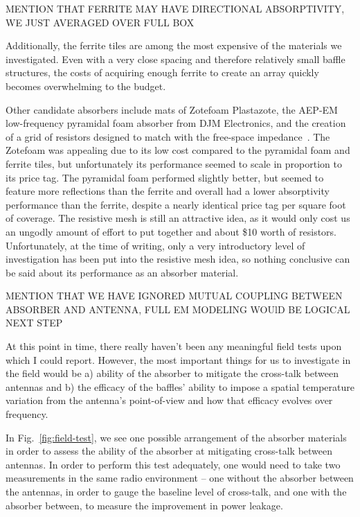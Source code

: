 MENTION THAT FERRITE MAY HAVE DIRECTIONAL ABSORPTIVITY, WE JUST AVERAGED OVER 
FULL BOX

Additionally, the ferrite tiles are among the most expensive of the materials 
we investigated. Even with a very close spacing and therefore relatively small 
baffle structures, the costs of acquiring enough ferrite to create an array 
quickly becomes overwhelming to the budget.

Other candidate absorbers include mats of Zotefoam Plastazote\textregistered, 
the AEP-EM low-frequency pyramidal foam absorber from DJM Electronics, and the 
creation of a grid of resistors designed to match with the free-space 
impedance~\citep{mahesh2015}. The Zotefoam was appealing due to its low cost 
compared to the pyramidal foam and ferrite tiles, but unfortunately its 
performance seemed to scale in proportion to its price tag.  The pyramidal foam 
performed slightly better, but seemed to feature more reflections than the 
ferrite and overall had a lower absorptivity performance than the ferrite, 
despite a nearly identical price tag per square foot of coverage. The resistive 
mesh is still an attractive idea, as it would only cost us an ungodly amount of 
effort to put together and about \$10 worth of resistors. Unfortunately, at the 
time of writing, only a very introductory level of investigation has been put 
into the resistive mesh idea, so nothing conclusive can be said about its 
performance as an absorber material.

MENTION THAT WE HAVE IGNORED MUTUAL COUPLING BETWEEN ABSORBER AND ANTENNA, FULL 
EM MODELING WOUlD BE LOGICAL NEXT STEP

At this point in time, there really haven't been any meaningful field tests 
upon which I could report. However, the most important things for us to 
investigate in the field would be a) ability of the absorber to mitigate the 
cross-talk between antennas and b) the efficacy of the baffles' ability to 
impose a spatial temperature variation from the antenna's point-of-view and how 
that efficacy evolves over frequency.

In Fig.~\ref{fig:field-test}, we see one possible arrangement of the absorber 
materials in order to assess the ability of the absorber at mitigating 
cross-talk between antennas. In order to perform this test adequately, one 
would need to take two measurements in the same radio environment -- one 
without the absorber between the antennas, in order to gauge the baseline level 
of cross-talk, and one with the absorber between, to measure the improvement in 
power leakage.

